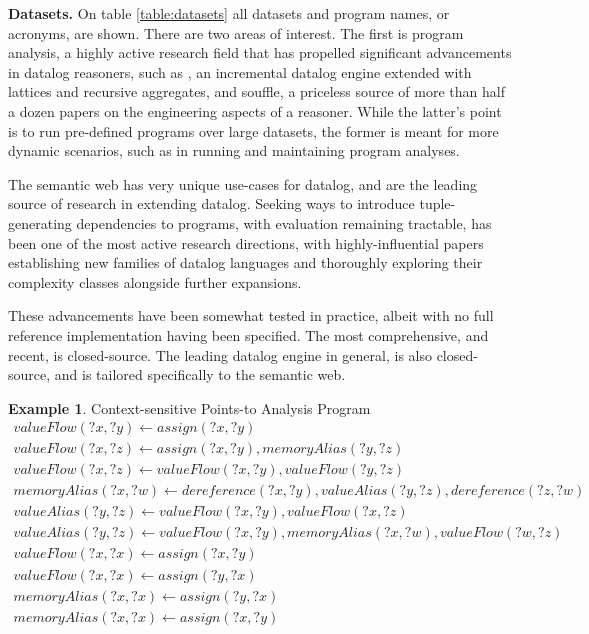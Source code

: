 \documentclass[sigconf,screen,review,natbib]{acmart}
\theoremstyle{definition}
\newtheorem{exmp}{Example}[section]
\begin{document}
\textbf{Datasets.} On table \ref{table:datasets} all datasets and program names, or acronyms, are shown. There are two areas of interest. The first is program analysis, a highly active research
field that has propelled significant advancements in datalog reasoners, such as \cite{incA}, an incremental datalog engine extended with lattices and recursive aggregates, and
souffle\cite{souffle}, a priceless source of more than half a dozen papers on the engineering aspects of a reasoner. While the latter's point is to run pre-defined programs over
large datasets, the former is meant for more dynamic scenarios, such as in running and maintaining program analyses.

The semantic web has very unique use-cases for datalog, and are the leading source of research in extending datalog. Seeking ways to introduce tuple-generating dependencies to
programs, with evaluation remaining tractable, has been one of the most active research directions, with highly-influential papers establishing new families of datalog
languages\cite{datalog_plus_minus} and thoroughly exploring their complexity classes alongside further expansions\cite{sticky,warded,monadic}.

These advancements have been somewhat tested in practice, albeit with no full reference implementation having been specified. The most comprehensive, and recent, is closed-source\cite{vadalog}.
The leading datalog engine in general, is also closed-source\cite{rdfox}, and is tailored specifically to the semantic web.

\begin{exmp}{Context-sensitive Points-to Analysis Program}
	\tiny
	\begin{align}
		valueFlow(?x, ?y) \leftarrow assign(?x, ?y)                                                 \\
		valueFlow(?x, ?z) \leftarrow assign(?x, ?y), memoryAlias(?y, ?z)                            \\
		valueFlow(?x, ?z) \leftarrow valueFlow(?x, ?y), valueFlow(?y, ?z)                           \\
		memoryAlias(?x, ?w) \leftarrow dereference(?x, ?y), valueAlias(?y, ?z), dereference(?z, ?w) \\
		valueAlias(?y, ?z) \leftarrow valueFlow(?x, ?y), valueFlow(?x, ?z)                          \\
		valueAlias(?y, ?z) \leftarrow valueFlow(?x, ?y), memoryAlias(?x, ?w), valueFlow(?w, ?z)     \\
		valueFlow(?x, ?x) \leftarrow assign(?x, ?y)                                                 \\
		valueFlow(?x, ?x) \leftarrow assign(?y, ?x)                                                 \\
		memoryAlias(?x, ?x) \leftarrow assign(?y, ?x)                                               \\
		memoryAlias(?x, ?x) \leftarrow assign(?x, ?y)
	\end{align}
	\label{program:cspa}
\end{exmp}
\end{document}
